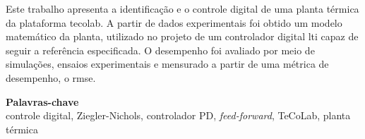 \begin{resumo}
Este trabalho apresenta a identificação e o controle digital de uma planta
térmica da plataforma \gls{tecolab}. A partir de dados experimentais foi obtido
um modelo matemático da planta, utilizado no projeto de um controlador digital
\gls{lti} capaz de seguir a referência especificada. O desempenho foi avaliado
por meio de simulações, ensaios experimentais e mensurado a partir de uma
métrica de desempenho, o \gls{rmse}.
\end{resumo}
{\small
\begin{center}
{\bfseries Palavras-chave}\\
controle digital, Ziegler-Nichols, controlador PD, \textit{feed-forward},
TeCoLab, planta térmica
\end{center}
}